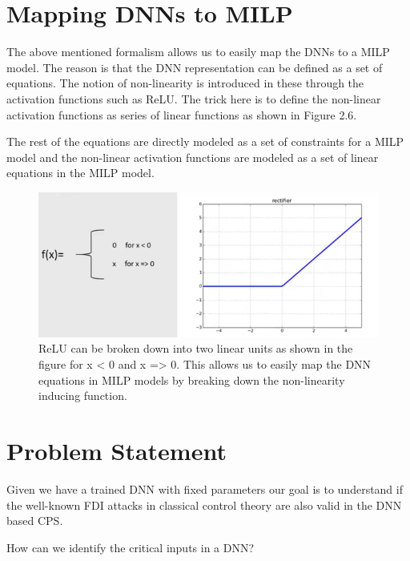 \section{Mapping DNNs to MILP}
The above mentioned formalism allows us to easily map the DNNs to a MILP model. The reason is that the DNN representation can be defined as a set of equations. The notion of non-linearity is introduced in these through the activation functions such as ReLU. The trick here is to define the non-linear activation functions as series of linear functions as shown in Figure 2.6. 

The rest of the equations are directly modeled as a set of constraints for a MILP model and the non-linear activation functions are modeled as a set of linear equations in the MILP model. 

\begin{figure}
	\centering
	\includegraphics[width=0.7\linewidth]{Images/ReLUbreakdown}
	\caption{ReLU can be broken down into two linear units as shown in the figure for x < 0 and x => 0. This allows us to easily map the DNN equations in MILP models by breaking down the non-linearity inducing function.}
	\label{fig:relubreakdown}
\end{figure}





\section{Problem Statement}

Given we have a trained DNN with fixed parameters our goal is to understand if the well-known FDI attacks in classical control theory are also valid in the DNN based CPS.
\begin{problem}
	How can we identify the critical inputs in a DNN?
\end{problem}

